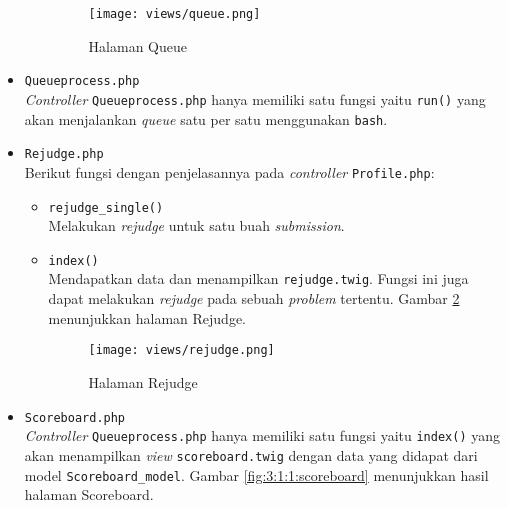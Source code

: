 \begin{itemize}
\begin{itemize}
		            \begin{figure}[H]
			            \centering
			            \texttt{[image: views/queue.png]}
			            \caption{Halaman Queue}
			            \label{fig:3:1:1:queue}
		            \end{figure}

		            \vspace{0.9cm}
	      \end{itemize}

	\item \verb|Queueprocess.php| \\
	      \textit{Controller} \verb|Queueprocess.php| hanya memiliki satu fungsi yaitu \verb|run()| yang akan menjalankan \textit{queue} satu per satu menggunakan \verb|bash|.

	\item \verb|Rejudge.php| \\
	      Berikut fungsi dengan penjelasannya pada \textit{controller} \verb|Profile.php|:

	      \begin{itemize}
		      \item \verb|rejudge_single()| \\
		            Melakukan \textit{rejudge} untuk satu buah \textit{submission}.
		      \item \verb|index()| \\
		            Mendapatkan data dan menampilkan \verb|rejudge.twig|. Fungsi ini juga dapat melakukan \textit{rejudge} pada sebuah \textit{problem} tertentu. Gambar \ref{fig:3:1:1:rejudge} menunjukkan halaman Rejudge.

		            \begin{figure}[H]
			            \centering
			            \texttt{[image: views/rejudge.png]}
			            \caption{Halaman Rejudge}
			            \label{fig:3:1:1:rejudge}
		            \end{figure}

	      \end{itemize}

	\item \verb|Scoreboard.php| \\
	      \textit{Controller} \verb|Queueprocess.php| hanya memiliki satu fungsi yaitu \verb|index()| yang akan menampilkan \textit{view} \verb|scoreboard.twig| dengan data yang didapat dari model \verb|Scoreboard_model|. Gambar \ref{fig:3:1:1:scoreboard} menunjukkan hasil halaman Scoreboard.


\end{itemize}
